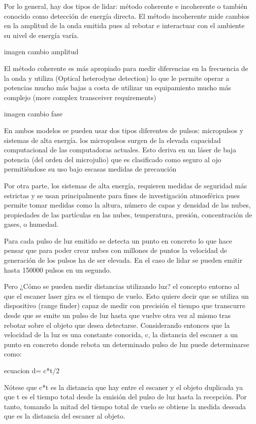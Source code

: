 Por lo general, hay dos tipos de lidar:
método coherente e incoherente o también conocido como detección de energía directa.
El método incoherente mide cambios en la amplitud de la onda emitida pues al rebotar e interactuar con el ambiente su nivel de energía varía.

imagen cambio amplitud

El método coherente es más apropiado para medir diferencias en la frecuencia de la onda y utiliza (Optical heterodyne detection) lo que le permite operar a potencias mucho más bajas a costa de utilizar un equipamiento mucho más complejo (more complex transceiver requirements)

imagen cambio fase


En ambos modelos se pueden usar dos tipos diferentes de pulsos: micropulsos y sistemas de alta energía.
los micropulsos surgen de la elevada capacidad computacional de las computadoras actuales. Esto deriva en un láser de baja potencia (del orden del microjulio) que es clasificado como seguro al ojo permitiéndose su uso bajo escasas medidas de precaución 

Por otra parte, los sistemas de alta energía, requieren medidas de seguridad más estrictas y se usan principalmente para fines de investigación atmosférica pues permite tomar medidas como la altura, número de capas y densidad de las nubes, propiedades de las partículas en las nubes, temperatura, presión, concentración de gases, o humedad.



Para cada pulso de luz emitido se detecta un punto en concreto lo que hace pensar que para poder crear nubes con millones de puntos la velocidad de generación de los pulsos ha de ser elevada. En el caso de lidar se pueden emitir hasta 150000 pulsos en un segundo.

Pero ¿Cómo se pueden medir distancias utilizando luz? el concepto entorno al que el escaner laser gira es el tiempo de vuelo. Esto quiere decir que se utiliza un dispositivo (range finder) capaz de medir con precisión el tiempo que transcurre desde que se emite un pulso de luz hasta que vuelve otra vez al mismo tras rebotar sobre el objeto que desea detectarse. Considerando entonces que la velocidad de la luz es una constante conocida, c, la distancia del escaner a un punto en concreto donde rebota un determinado pulso de luz puede determinarse como:

ecuacion d= c*t/2

Nótese que c*t es la distancia que hay entre el escaner y el objeto duplicada ya que t es el tiempo total desde la emisión del pulso de luz hasta la recepción. Por tanto, tomando la mitad del tiempo total de vuelo se obtiene la medida deseada que es la distancia del escaner al objeto.

